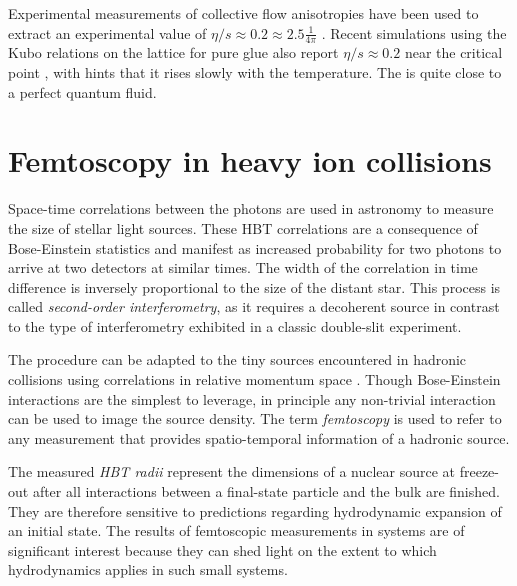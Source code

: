 Experimental measurements of collective flow anisotropies have been used to extract an experimental value of $\eta/s \approx 0.2 \approx 2.5\frac{1}{4\pi}$ \cite{Heinz:2013th}.
Recent simulations using the Kubo relations on the lattice for pure glue also report $\eta/s \approx 0.2$ near the critical point \cite{Astrakhantsev:2017nrs}, with hints that it rises slowly with the temperature.
The \qgp is quite close to a perfect quantum fluid.


\section{Femtoscopy in heavy ion collisions}

Space-time correlations between the photons are used in astronomy to measure the size of stellar light sources.
These \ac{HBT} correlations \cite{HanburyBrown:1954,HanburyBrown:1956} are a consequence of Bose-Einstein statistics and manifest as increased probability for two photons to arrive at two detectors at similar times.
The width of the correlation in time difference is inversely proportional to the size of the distant star.
This process is called \emph{second-order interferometry}, as it requires a decoherent source in contrast to the type of interferometry exhibited in a classic double-slit experiment.

The procedure can be adapted to the tiny sources encountered in hadronic collisions using correlations in relative momentum space \cite{Goldhaber:1960sf}.
Though Bose-Einstein interactions are the simplest to leverage, in principle any non-trivial interaction can be used to image the source density.
The term \emph{femtoscopy} is used to refer to any measurement that provides spatio-temporal information of a hadronic source.

The measured \emph{\ac{HBT} radii} represent the dimensions of a nuclear source at freeze-out after all interactions between a final-state particle and the bulk are finished.
They are therefore sensitive to predictions regarding hydrodynamic expansion of an initial state.
The results of femtoscopic measurements in \pPb systems are of significant interest because they can shed light on the extent to which hydrodynamics applies in such small systems.

